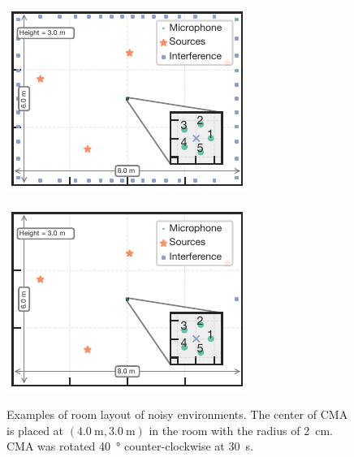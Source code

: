 \documentclass[sip,biber]{now-journal}
\begin{document}
\begin{figure}[t]
  \centering
  \begin{minipage}[t]{.45\linewidth}
    \centering
    \includegraphics[width=.9\columnwidth]{figures/room_layout_noise-multi.pdf}
    \label{fig:layout:noise:multi}
  \end{minipage}
  \hspace{.05\linewidth}
  \begin{minipage}[t]{.45\linewidth}
    \centering
    \includegraphics[width=.9\columnwidth]{figures/room_layout_noise-single.pdf}
    \label{fig:layout:noise:single}
  \end{minipage}
  \caption{%
    Examples of room layout of noisy environments.
    The center of CMA is placed at $(\SI{4.0}{\metre}, \SI{3.0}{\metre})$ in the room with the radius of \SI{2}{\centi\metre}.
    CMA was rotated \SI{40}{\degree} counter-clockwise at \SI{30}{\second}.
  }%
  \label{fig:layout:noise}
\end{figure}
\end{document}
